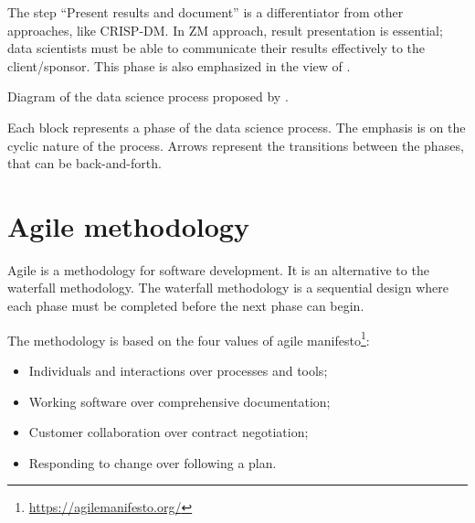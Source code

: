 The step ``Present results and document'' is a differentiator from other approaches, like
CRISP-DM.  In ZM approach, result presentation is essential; data scientists must be able
to communicate their results effectively to the client/sponsor.  This phase is also
emphasized in the view of \textcite{Wickham2023}.

\begin{figurebox}[label=fig:zumel]{Diagram of the data science process proposed by \textcite{Zumel2019}.}
  \centering

  \tcblower
  Each block represents a phase of the data science process.  The emphasis is on the
  cyclic nature of the process.  Arrows represent the transitions between the phases, that
  can be back-and-forth.
\end{figurebox}

\section{Agile methodology}

Agile is a methodology for software development.  It is an alternative to the waterfall
methodology.  The waterfall methodology is a sequential design where each phase
must be completed before the next phase can begin.

The methodology is based on the four values of agile manifesto\footnote{\url{https://agilemanifesto.org/}}:
\begin{itemize}
  \itemsep0em
  \item Individuals and interactions over processes and tools;
  \item Working software over comprehensive documentation;
  \item Customer collaboration over contract negotiation;
  \item Responding to change over following a plan.
\end{itemize}

